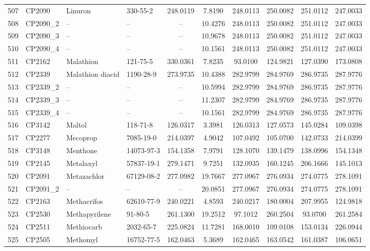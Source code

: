 \begin{longtable}{clllcccccc}
507 & CP2090 & Linuron & 330-55-2 & 248.0119 & 7.8190 & 248.0113 & 250.0082 & 251.0112 & 247.0033 \\ 
508 & CP2090\_2 & – & – & – & 10.4276 & 248.0113 & 250.0082 & 251.0112 & 247.0033 \\ 
509 & CP2090\_3 & – & – & – & 10.9678 & 248.0113 & 250.0082 & 251.0112 & 247.0033 \\ 
510 & CP2090\_4 & – & – & – & 10.1561 & 248.0113 & 250.0082 & 251.0112 & 247.0033 \\ 
511 & CP2162 & Malathion & 121-75-5 & 330.0361 & 7.8235 & 93.0100 & 124.9821 & 127.0390 & 173.0808 \\ 
512 & CP2339 & Malathion diacid & 1190-28-9 & 273.9735 & 10.4388 & 282.9799 & 284.9769 & 286.9735 & 287.9776 \\ 
513 & CP2339\_2 & – & – & – & 10.5994 & 282.9799 & 284.9769 & 286.9735 & 287.9776 \\ 
514 & CP2339\_3 & – & – & – & 11.2307 & 282.9799 & 284.9769 & 286.9735 & 287.9776 \\ 
515 & CP2339\_4 & – & – & – & 10.1561 & 282.9799 & 284.9769 & 286.9735 & 287.9776 \\ 
516 & CP3142 & Maltol & 118-71-8 & 126.0317 & 3.3981 & 126.0313 & 127.0573 & 145.0284 & 109.0398 \\ 
517 & CP2277 & Mecoprop & 7085-19-0 & 214.0397 & 4.9042 & 107.0492 & 105.0700 & 142.0733 & 214.0399 \\ 
518 & CP3148 & Menthone\smash{\textsuperscript{\textdaggerdbl}} & 14073-97-3 & 154.1358 & 7.9791 & 128.1070 & 139.1479 & 138.0996 & 154.1348 \\ 
519 & CP2145 & Metalaxyl\smash{\textsuperscript{\textdaggerdbl}} & 57837-19-1 & 279.1471 & 9.7251 & 132.0935 & 160.1245 & 206.1666 & 145.1013 \\ 
520 & CP2091 & Metazachlor & 67129-08-2 & 277.0982 & 19.7667 & 277.0967 & 276.0934 & 274.0775 & 278.1091 \\ 
521 & CP2091\_2 & – & – & – & 20.0851 & 277.0967 & 276.0934 & 274.0775 & 278.1091 \\ 
522 & CP2163 & Methacrifos & 62610-77-9 & 240.0221 & 4.8593 & 240.0217 & 180.0004 & 207.9955 & 124.9818 \\ 
523 & CP2530 & Methapyrilene & 91-80-5 & 261.1300 & 19.2512 & 97.1012 & 260.2504 & 93.0700 & 261.2584 \\ 
524 & CP2511 & Methiocarb & 2032-65-7 & 225.0824 & 11.7281 & 168.0010 & 109.0108 & 153.0134 & 226.0944 \\ 
525 & CP2505 & Methomyl & 16752-77-5 & 162.0463 & 5.3689 & 162.0465 & 163.0542 & 161.0387 & 106.0651 \\ 

\end{longtable}
